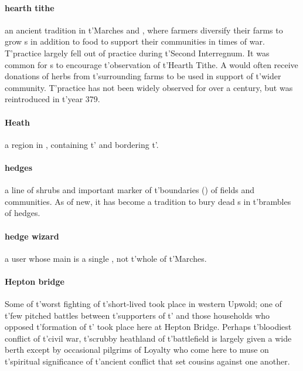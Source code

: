 \paragraph{hearth tithe} an ancient tradition in t'\allowbreak Marches and , where farmers diversify their farms to grow s in addition to food to support their communities in times of war. T'practice largely fell out of practice during t'\allowbreak Second Interregnum. It was common for s to encourage t'\allowbreak observation of t'\allowbreak Hearth Tithe. A  would often receive donations of herbs from t'\allowbreak surrounding farms to be used in support of t'\allowbreak wider community. T'practice has not been widely observed for over a century, but was reintroduced in t'\allowbreak year 379.
\paragraph{Heath} a region in , containing t'\allowbreak {} and bordering t'\allowbreak {}.
\paragraph{hedges} a line of shrubs and important marker of t'\allowbreak boundaries () of fields and communities. As of new, it has become a tradition to bury dead s in t'\allowbreak brambles of hedges. 
\paragraph{hedge wizard} a  user whose main  is a single , not t'\allowbreak whole of t'\allowbreak Marches.
\paragraph{Hepton bridge} Some of t'\allowbreak worst fighting of t'\allowbreak short-lived  took place in western Upwold; one of t'\allowbreak few pitched battles between t'\allowbreak supporters of t'\allowbreak {} and those households who opposed t'\allowbreak formation of t'\allowbreak {} took place here at Hepton Bridge. Perhaps t'\allowbreak bloodiest conflict of t'\allowbreak civil war, t'\allowbreak scrubby heathland of t'\allowbreak battlefield is largely given a wide berth except by occasional pilgrims of Loyalty who come here to muse on t'\allowbreak spiritual significance of t'\allowbreak ancient conflict that set cousins against one another. 

